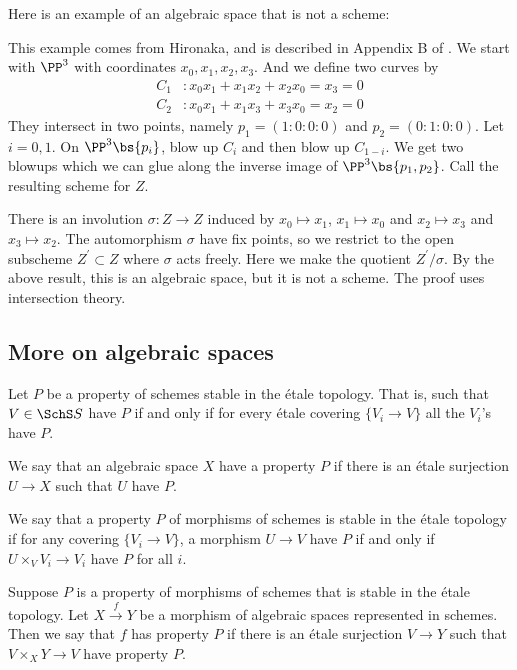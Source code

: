 \documentclass[11pt, english]{article}
\begin{document}
Here is an example of an algebraic space that is not a scheme:

\begin{example}
This example comes from Hironaka, and is described in Appendix B of \cite{hartshorne}. We start with $\PP^3$ with coordinates $x_0,x_1,x_2,x_3$. And we define two curves by
\begin{align*}
C_1 &: x_0x_1+x_1x_2+x_2x_0=x_3=0 \\
C_2 &: x_0x_1+x_1x_3+x_3x_0=x_2= 0
\end{align*}
They intersect in two points, namely $p_1=(1:0:0:0)$ and $p_2=(0:1:0:0)$. Let $i=0,1$. On $\PP^3 \bs \{p_i\}$,  blow up $C_i$ and then blow up $C_{1-i}$. We get two blowups which we can glue along the inverse image of $\PP^3 \bs \{p_1,p_2\}$. Call the resulting scheme for $Z$.

There is an involution $\sigma:Z \to Z$ induced by $x_0 \mapsto x_1$, $x_1 \mapsto x_0$ and $x_2 \mapsto x_3$ and $x_3 \mapsto x_2$. The automorphism $\sigma$ have fix points, so we restrict to the open subscheme $Z^\prime \subset Z$ where $\sigma$ acts freely. Here we make the quotient $Z^\prime/\sigma$. By the above result, this is an algebraic space, but it is not a scheme. The proof uses intersection theory.
\end{example}

\subsection{More on algebraic spaces}

Let $P$ be a property of schemes stable in the étale topology. That is, such that $V \in \SchS S$ have $P$ if and only if for every étale covering $\{ V_i \to V\}$ all the $V_i$'s have $P$. 

\begin{defi}
We say that an algebraic space $X$ have a property $P$ if there is an étale surjection $U \to X$ such that $U$ have $P$.
\end{defi}

We say that a property $P$ of morphisms of schemes is stable in the étale topology if for any covering $\{ V_i \to V\}$, a morphism $U \to V$ have $P$ if and only if $U \times_V V_i \to V_i$ have $P$ for all $i$.

\begin{defi}
Suppose $P$ is a property of morphisms of schemes that is stable in the étale topology. Let $X \xrightarrow{f} Y$ be a morphism of algebraic spaces represented in schemes. Then we say that $f$ has property $P$ if there is an étale surjection $V \to Y$ such that $V \times_X Y \to V$ have property $P$.
\end{defi}
\end{document}
